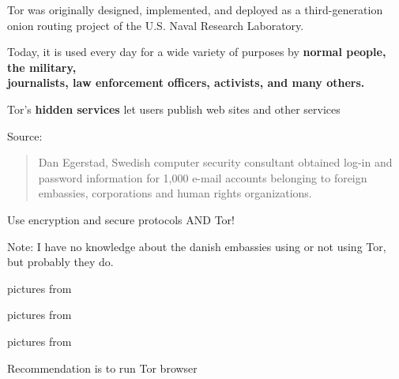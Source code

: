 \documentclass[20pt,landscape,a4paper,footrule]{foils}
\begin{document}

\begin{list2}
\item Tor was originally designed, implemented, and deployed as a third-generation onion routing project of the U.S. Naval Research Laboratory.
\item Today, it is used every day for a wide variety of purposes by {\bf normal people, the military, \\
journalists, law enforcement officers, activists, and many others.}
\item Tor's {\bf hidden services} let users publish web sites and other services
\end{list2}

Source:\\




\begin{quote}
Dan Egerstad, Swedish computer security consultant obtained log-in and password information for 1,000 e-mail accounts belonging to foreign embassies, corporations and human rights organizations.
\end{quote}

\centerline{Use encryption and secure protocols AND Tor!}

{\small Note: I have no knowledge about the danish embassies using or not using Tor, but probably they do.}




\centerline{pictures from }



\centerline{pictures from }



\centerline{pictures from }


Recommendation is to run Tor browser
\end{document}
